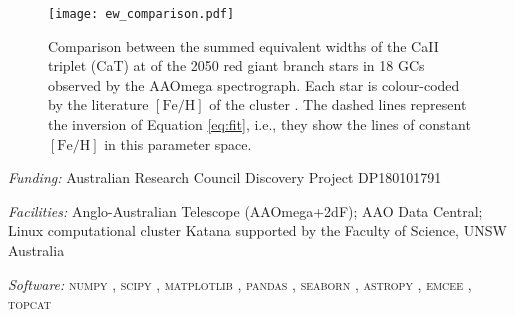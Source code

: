 \documentclass[RNAAS]{aastex63}
\newcommand{\feh}{\ensuremath{[\textrm{Fe}/\textrm{H}]}\xspace}
\begin{document}
\begin{figure}[h!]
\begin{center}
\texttt{[image: ew\_comparison.pdf]}
\caption{Comparison between the summed equivalent widths of the CaII triplet (CaT) at of the 2050 red giant branch stars in 18 GCs observed by the AAOmega spectrograph. Each star is colour-coded by the literature \feh of the cluster \citep{Usher2019}. The dashed lines represent the inversion of Equation \ref{eq:fit}, i.e., they show the lines of constant \feh in this parameter space. \label{fig:the_figure}}
\end{center}
\end{figure}

\acknowledgments

{\it Funding:}
{Australian Research Council Discovery Project DP180101791}

{\it Facilities:} 
{Anglo-Australian Telescope (AAOmega+2dF); AAO Data Central; Linux computational cluster Katana supported by the Faculty of Science, UNSW Australia}

{\it Software:} 
{\textsc{numpy} \citep{numpy}, 
\textsc{scipy} \citep{SciPy1.0Contributors2020}, 
\textsc{matplotlib} \citep{matplotlib}, 
\textsc{pandas} \citep{pandas},
\textsc{seaborn} \citep{seaborn},
\textsc{astropy} \citep{TheAstropyCollaboration2018},
\textsc{emcee} \citep{Foreman-Mackey2013a},
\textsc{topcat} \citep{Taylor2005,Taylor2006}
}
\end{document}
